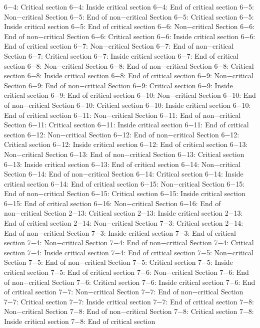 6−4: Critical section
6−4: Inside critical section
6−4: End of critical section
6−5: Non−critical Section
6−5: End of non−critical Section
6−5: Critical section
6−5: Inside critical section
6−5: End of critical section
6−6: Non−critical Section
6−6: End of non−critical Section
6−6: Critical section
6−6: Inside critical section
6−6: End of critical section
6−7: Non−critical Section
6−7: End of non−critical Section
6−7: Critical section
6−7: Inside critical section
6−7: End of critical section
6−8: Non−critical Section
6−8: End of non−critical Section
6−8: Critical section
6−8: Inside critical section
6−8: End of critical section
6−9: Non−critical Section
6−9: End of non−critical Section
6−9: Critical section
6−9: Inside critical section
6−9: End of critical section
6−10: Non−critical Section
6−10: End of non−critical Section
6−10: Critical section
6−10: Inside critical section
6−10: End of critical section
6−11: Non−critical Section
6−11: End of non−critical Section
6−11: Critical section
6−11: Inside critical section
6−11: End of critical section
6−12: Non−critical Section
6−12: End of non−critical Section
6−12: Critical section
6−12: Inside critical section
6−12: End of critical section
6−13: Non−critical Section
6−13: End of non−critical Section
6−13: Critical section
6−13: Inside critical section
6−13: End of critical section
6−14: Non−critical Section
6−14: End of non−critical Section
6−14: Critical section
6−14: Inside critical section
6−14: End of critical section
6−15: Non−critical Section
6−15: End of non−critical Section
6−15: Critical section
6−15: Inside critical section
6−15: End of critical section
6−16: Non−critical Section
6−16: End of non−critical Section
2−13: Critical section
2−13: Inside critical section
2−13: End of critical section
2−14: Non−critical Section
7−3: Critical section
2−14: End of non−critical Section
7−3: Inside critical section
7−3: End of critical section
7−4: Non−critical Section
7−4: End of non−critical Section
7−4: Critical section
7−4: Inside critical section
7−4: End of critical section
7−5: Non−critical Section
7−5: End of non−critical Section
7−5: Critical section
7−5: Inside critical section
7−5: End of critical section
7−6: Non−critical Section
7−6: End of non−critical Section
7−6: Critical section
7−6: Inside critical section
7−6: End of critical section
7−7: Non−critical Section
7−7: End of non−critical Section
7−7: Critical section
7−7: Inside critical section
7−7: End of critical section
7−8: Non−critical Section
7−8: End of non−critical Section
7−8: Critical section
7−8: Inside critical section
7−8: End of critical section
